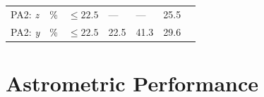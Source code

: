 \documentclass[DM,lsstdraft,toc]{lsstdoc}
\begin{document}
\begin{longtable}[]{@{}lllllll@{}}
\begin{minipage}[t]{0.12\columnwidth}
PA2: \emph{z}\strut
\end{minipage} & \begin{minipage}[t]{0.06\columnwidth}\raggedright\strut
\%\strut
\end{minipage} & \begin{minipage}[t]{0.14\columnwidth}\raggedright\strut
\(\leq 22.5\)\strut
\end{minipage} & \begin{minipage}[t]{0.14\columnwidth}\raggedright\strut
---\strut
\end{minipage} & \begin{minipage}[t]{0.12\columnwidth}\raggedright\strut
---\strut
\end{minipage} & \begin{minipage}[t]{0.12\columnwidth}\raggedright\strut
25.5\strut
\end{minipage} & \begin{minipage}[t]{0.17\columnwidth}\raggedright\strut
\strut
\end{minipage}\tabularnewline
\begin{minipage}[t]{0.12\columnwidth}\raggedright\strut
PA2: \emph{y}\strut
\end{minipage} & \begin{minipage}[t]{0.06\columnwidth}\raggedright\strut
\%\strut
\end{minipage} & \begin{minipage}[t]{0.14\columnwidth}\raggedright\strut
\(\leq 22.5\)\strut
\end{minipage} & \begin{minipage}[t]{0.14\columnwidth}\raggedright\strut
22.5\strut
\end{minipage} & \begin{minipage}[t]{0.12\columnwidth}\raggedright\strut
41.3\strut
\end{minipage} & \begin{minipage}[t]{0.12\columnwidth}\raggedright\strut
29.6\strut
\end{minipage} & \begin{minipage}[t]{0.17\columnwidth}\raggedright\strut
\strut
\end{minipage}\tabularnewline
\bottomrule
\end{longtable}

\section{Astrometric Performance}\label{astrometric-performance}
\end{document}

